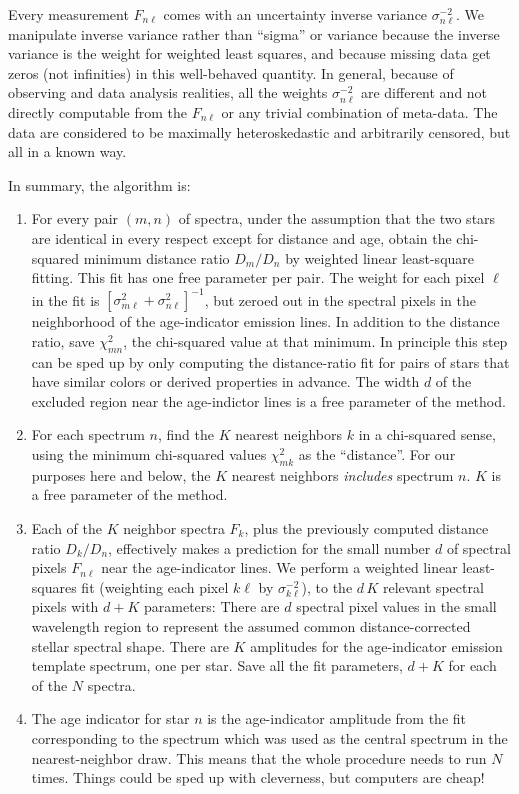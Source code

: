 \documentclass[12pt, preprint]{aastex}
\newcommand{\var}{\sigma^{2}}
\newcommand{\invvar}{\sigma^{-2}}
\begin{document}
Every measurement $F_{n\ell}$ comes with an uncertainty inverse
variance $\invvar_{n\ell}$.  We manipulate inverse variance rather
than ``sigma'' or variance because the inverse variance is the weight
for weighted least squares, and because missing data get zeros (not
infinities) in this well-behaved quantity.  In general, because of
observing and data analysis realities, all the weights
$\invvar_{n\ell}$ are different and not directly computable from the
$F_{n\ell}$ or any trivial combination of meta-data.  The data are
considered to be maximally heteroskedastic and arbitrarily censored,
but all in a known way.

In summary, the algorithm is:
\begin{enumerate}
\item For every pair $(m, n)$ of spectra, under the assumption that
  the two stars are identical in every respect except for distance and
  age, obtain the chi-squared minimum distance ratio $D_m/D_n$ by
  weighted linear least-square fitting.  This fit has one free
  parameter per pair.  The weight for each pixel $\ell$ in the fit is
  $[\var_{m\ell} + \var_{n\ell}]^{-1}$, but zeroed out in the spectral
  pixels in the neighborhood of the age-indicator emission lines.  In
  addition to the distance ratio, save $\chi^2_{mn}$, the chi-squared
  value at that minimum.  In principle this step can be sped up by
  only computing the distance-ratio fit for pairs of stars that have
  similar colors or derived properties in advance.  The width $d$ of
  the excluded region near the age-indictor lines is a free parameter
  of the method.
\item For each spectrum $n$, find the $K$ nearest neighbors $k$ in a
  chi-squared sense, using the minimum chi-squared values
  $\chi^2_{mk}$ as the ``distance''.  For our purposes here and below,
  the $K$ nearest neighbors \emph{includes} spectrum $n$.  $K$ is a
  free parameter of the method.
\item Each of the $K$ neighbor spectra $F_k$, plus the previously
  computed distance ratio $D_k/D_n$, effectively makes a prediction
  for the small number $d$ of spectral pixels $F_{n\ell}$ near the
  age-indicator lines.  We perform a weighted linear least-squares fit
  (weighting each pixel $k\ell$ by $\invvar_{k\ell}$), to the $d\,K$
  relevant spectral pixels with $d+K$ parameters: There are $d$
  spectral pixel values in the small wavelength region to represent
  the assumed common distance-corrected stellar spectral shape.  There
  are $K$ amplitudes for the age-indicator emission template spectrum,
  one per star.  Save all the fit parameters, $d+K$ for each of the
  $N$ spectra.
\item The age indicator for star $n$ is the age-indicator amplitude
  from the fit corresponding to the spectrum which was used as the
  central spectrum in the nearest-neighbor draw.  This means that the
  whole procedure needs to run $N$ times.  Things could be sped up
  with cleverness, but computers are cheap!
\end{enumerate}
\end{document}
